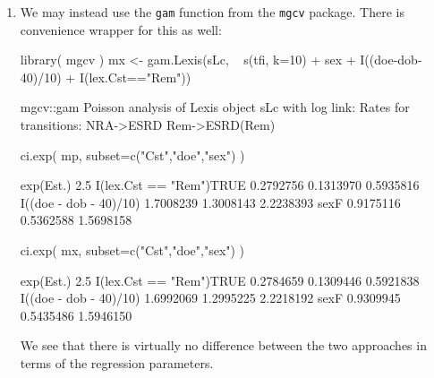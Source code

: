 \begin{enumerate}[resume]
\item We may instead use the \texttt{gam} function from the
  \texttt{mgcv} package. There is convenience wrapper for this as well:
\begin{Schunk}
\begin{Sinput}
 library( mgcv )
 mx <- gam.Lexis(sLc, 
                 ~ s(tfi, k=10) + sex + I((doe-dob-40)/10) + I(lex.Cst=="Rem"))
\end{Sinput}
\begin{Soutput}
mgcv::gam Poisson analysis of Lexis object sLc with log link:
Rates for transitions:
NRA->ESRD
Rem->ESRD(Rem)
\end{Soutput}
\begin{Sinput}
 ci.exp( mp, subset=c("Cst","doe","sex") )
\end{Sinput}
\begin{Soutput}
                        exp(Est.)      2.5%     97.5%
I(lex.Cst == "Rem")TRUE 0.2792756 0.1313970 0.5935816
I((doe - dob - 40)/10)  1.7008239 1.3008143 2.2238393
sexF                    0.9175116 0.5362588 1.5698158
\end{Soutput}
\begin{Sinput}
 ci.exp( mx, subset=c("Cst","doe","sex") )
\end{Sinput}
\begin{Soutput}
                        exp(Est.)      2.5%     97.5%
I(lex.Cst == "Rem")TRUE 0.2784659 0.1309446 0.5921838
I((doe - dob - 40)/10)  1.6992069 1.2995225 2.2218192
sexF                    0.9309945 0.5435486 1.5946150
\end{Soutput}
\end{Schunk}
We see that there is virtually no difference between the two
approaches in terms of the regression parameters.



\end{enumerate}
